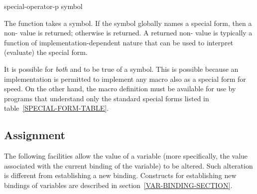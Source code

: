 \begin{defun}[Function]
special-operator-p symbol

The function  takes a symbol.  If the symbol
globally names a special form,
then a non-{\false} value is returned; otherwise {\false} is returned.
A returned non-{\nil} value is typically a function
of implementation-dependent nature that can be used to
interpret (evaluate) the special form.

It is possible for \emph{both}  and 
to be true of a symbol.  This is possible because an implementation is
permitted to implement any macro also as a special form for speed.
On the other hand, the macro definition must be available
for use by programs that understand only the standard special forms
listed in table~\ref{SPECIAL-FORM-TABLE}.
\end{defun}

\subsection{Assignment}

The following facilities allow the value of a variable (more specifically,
the value associated with the current binding of the variable) to be altered.
Such alteration is different from establishing a new binding.
Constructs for establishing new bindings of variables are described
in section~\ref{VAR-BINDING-SECTION}.

